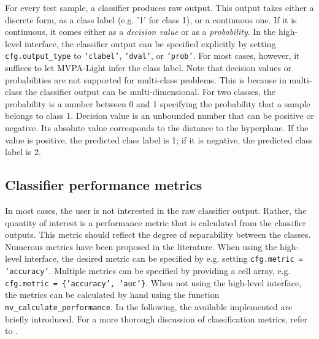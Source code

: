 \documentclass[utf8]{frontiersSCNS} %
\newcommand{\mvpa}{MVPA-Light}
\newcommand{\ttt}[1]{\texttt{#1}}
\begin{document}
For every test sample, a classifier produces raw output. This output takes either a discrete form, as a class label (e.g. '1' for class 1), or a continuous one. If it is continuous, it comes either as a \textit{decision value} or as a \textit{probability}.
In the high-level interface, the classifier output can be specified explicitly by setting \ttt{cfg.output\_type} to \ttt{'clabel'}, \ttt{'dval'}, or \ttt{'prob'}. For most cases, however, it suffices to let \mvpa{} infer the class label. Note that decision values or probabilities are not supported for multi-class problems. This is because in multi-class the classifier output can be multi-dimensional. For two classes, the probability is a number between 0 and 1 specifying the probability that a sample belongs to class 1. Decision value is an unbounded number that can be positive or negative. Its absolute value corresponds to the distance to the hyperplane.
 If the value is positive, the predicted class label is 1; if it is negative, the predicted class label is 2.

\subsection{Classifier performance metrics}\label{sec:metrics}

In most cases, the user is not interested in the raw classifier output. Rather, the quantity of interest is a performance metric that is calculated from the classifier outputs.
This metric should reflect the degree of separability between the classes. Numerous metrics have been proposed in the literature.  When using the high-level interface, the desired metric can be specified by e.g. setting \ttt{cfg.metric = 'accuracy'}. Multiple metrics can be specified by providing a cell array, e.g. \ttt{cfg.metric = \{'accuracy', 'auc'\}}. When not using the high-level interface, the metrics can be calculated by hand using the function \ttt{mv\_calculate\_performance}. In the following, the available implemented are briefly introduced. For a more thorough discussion of classification metrics, refer to  \cite{Sokolova2009ATasks}.
\end{document}

